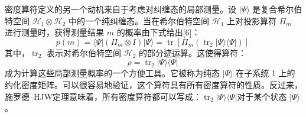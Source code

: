 密度算符定义的另一个动机来自于考虑对纠缠态的局部测量。设 \(|\Psi\rangle\) 是复合希尔伯特空间 \(\mathcal{H}_1 \otimes \mathcal{H}_2\) 中的一个纯纠缠态。当在希尔伯特空间 \(\mathcal{H}_1\) 上对投影算符 \(\Pi_m\) 进行测量时，获得测量结果 \(m\) 的概率由下式给出[6]：
\[
p(m) = \langle \Psi | (\Pi_m \otimes I) | \Psi \rangle = \operatorname{tr} \left[ \Pi_m \left( \operatorname{tr}_2 |\Psi \rangle \langle \Psi | \right) \right]~
\]
其中，\(\operatorname{tr}_2\) 表示对希尔伯特空间 \(\mathcal{H}_2\) 的部分迹运算。这使得算符：
\[
\rho = \operatorname{tr}_2 |\Psi \rangle \langle \Psi |~
\]
成为计算这些局部测量概率的一个方便工具。它被称为纯态 \(|\Psi\rangle\) 在子系统 1 上的约化密度矩阵。可以很容易地验证，这个算符具有所有密度算符的性质。反过来，施罗德–HJW定理意味着，所有密度算符都可以写成：\(\operatorname{tr}_2 |\Psi \rangle \langle \Psi |\)对于某个状态 \(|\Psi \rangle\)。
